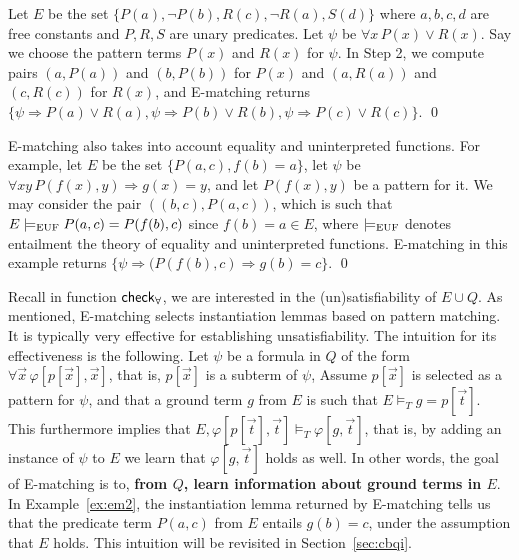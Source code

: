 \documentclass[oribibl]{llncs}
\begin{document}
\begin{example}
\label{ex:em2}
Let $E$ be the set $\{ P(a), \neg P(b), R(c), \neg R(a), S(d) \}$ where $a,b,c,d$ are free constants and $P,R,S$ are unary predicates.
Let $\psi$ be $\forall x\, P( x ) \vee R( x )$.
Say we choose the pattern terms $P( x )$ and $R( x )$ for $\psi$.
In Step 2, we compute pairs $( a, P( a ) )$ and $( b, P( b ) )$ for $P( x )$ and
$( a, R( a ) )$ and $( c, R( c ) )$ for $R( x )$,
and E-matching returns $\{
\psi \Rightarrow P( a ) \vee R( a ), \psi \Rightarrow P( b ) \vee R( b ), \psi \Rightarrow P( c ) \vee R( c )
\}$.
\qed
\end{example}

\begin{example}
\label{ex:em2}
E-matching also takes into account equality and uninterpreted functions.
For example, let $E$ be the set $\{ P( a, c ), f( b ) = a \}$,
let $\psi$ be $\forall xy\, P( f( x ), y ) \Rightarrow g( x ) = y$,
and let $P( f( x ), y )$ be a pattern for it.
We may consider the pair $( ( b, c ), P( a, c ) )$, which is such that $E \models_\mathrm{EUF} P( a, c ) = P( f( b ), c )$ since $f( b ) = a \in E$,
where $\models_\mathrm{EUF}$ denotes entailment the theory of equality and uninterpreted functions.
E-matching in this example returns $\{ \psi \Rightarrow ( P( f( b ), c ) \Rightarrow g( b ) = c \}$.
\qed
\end{example}

Recall in function $\small\mathsf{check}_\forall$, we are interested in the (un)satisfiability of $E \cup Q$.
As mentioned, E-matching selects instantiation lemmas based on pattern matching.
It is typically very effective for establishing unsatisfiability.
The intuition for its effectiveness is the following. 
Let $\psi$ be a formula in $Q$ of the form $\forall \vec x\, \varphi[ p[ \vec x ], \vec x ]$, 
that is, $p[ \vec x ]$ is a subterm of $\psi$,
Assume $p[ \vec x ]$ is selected as a pattern for $\psi$, and
that a ground term $g$ from $E$ is such that $E \models_T g = p[ \vec t ]$.
This furthermore implies that $E, \varphi[ p[ \vec t ], \vec t ] \models_T \varphi[ g, \vec t ]$,
that is, by adding an instance of $\psi$ to $E$ we learn that $\varphi[ g, \vec t ]$ holds as well.
In other words, 
the goal of E-matching is to, {\bf from $Q$, learn information about ground terms in $E$}.
In Example~\ref{ex:em2}, the instantiation lemma returned by E-matching tells us
that the predicate term $P( a, c )$ from $E$ entails $g( b ) = c$, under the assumption that $E$ holds.
This intuition will be revisited in Section~\ref{sec:cbqi}.
\end{document}
